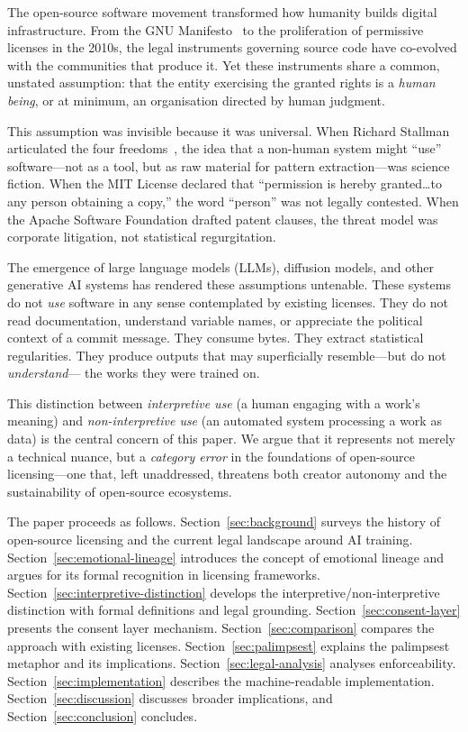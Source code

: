 \documentclass[11pt,twocolumn]{article}
\begin{document}
The open-source software movement transformed how humanity builds digital
infrastructure. From the GNU Manifesto~\cite{stallman1985gnu} to the
proliferation of permissive licenses in the 2010s, the legal instruments
governing source code have co-evolved with the communities that produce
it. Yet these instruments share a common, unstated assumption: that the
entity exercising the granted rights is a \emph{human being}, or at
minimum, an organisation directed by human judgment.

This assumption was invisible because it was universal. When Richard
Stallman articulated the four freedoms~\cite{stallman2002free}, the idea
that a non-human system might ``use'' software---not as a tool, but as
raw material for pattern extraction---was science fiction. When the MIT
License declared that ``permission is hereby granted\ldots to any person
obtaining a copy,'' the word ``person'' was not legally contested. When
the Apache Software Foundation drafted patent clauses, the threat model
was corporate litigation, not statistical regurgitation.

The emergence of large language models (LLMs), diffusion models, and
other generative AI systems has rendered these assumptions untenable.
These systems do not \emph{use} software in any sense contemplated by
existing licenses. They do not read documentation, understand variable
names, or appreciate the political context of a commit message. They
consume bytes. They extract statistical regularities. They produce
outputs that may superficially resemble---but do not \emph{understand}---%
the works they were trained on.

This distinction between \emph{interpretive use} (a human engaging with
a work's meaning) and \emph{non-interpretive use} (an automated system
processing a work as data) is the central concern of this paper. We argue
that it represents not merely a technical nuance, but a \emph{category
error} in the foundations of open-source licensing---one that, left
unaddressed, threatens both creator autonomy and the sustainability of
open-source ecosystems.

The paper proceeds as follows. Section~\ref{sec:background} surveys the
history of open-source licensing and the current legal landscape around
AI training. Section~\ref{sec:emotional-lineage} introduces the concept
of emotional lineage and argues for its formal recognition in licensing
frameworks. Section~\ref{sec:interpretive-distinction} develops the
interpretive/non-interpretive distinction with formal definitions and
legal grounding. Section~\ref{sec:consent-layer} presents the consent
layer mechanism. Section~\ref{sec:comparison} compares the approach with
existing licenses. Section~\ref{sec:palimpsest} explains the palimpsest
metaphor and its implications. Section~\ref{sec:legal-analysis} analyses
enforceability. Section~\ref{sec:implementation} describes the
machine-readable implementation. Section~\ref{sec:discussion} discusses
broader implications, and Section~\ref{sec:conclusion} concludes.
\end{document}
